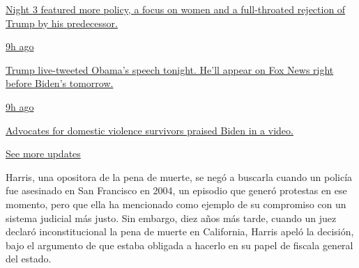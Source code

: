 \href{https://www.nytimes3xbfgragh.onion/live/2020/08/19/us/dnc-convention-election?action=click\&pgtype=Article\&state=default\&region=MAIN_CONTENT_1\&context=storylines_live_updates\#night-3-featured-more-policy-a-focus-on-women-and-a-full-throated-rejection-of-trump-by-his-predecessor}{Night
3 featured more policy, a focus on women and a full-throated rejection
of Trump by his predecessor.}

\href{https://www.nytimes3xbfgragh.onion/live/2020/08/19/us/dnc-convention-election?action=click\&pgtype=Article\&state=default\&region=MAIN_CONTENT_1\&context=storylines_live_updates\#trump-live-tweeted-obamas-speech-tonight-hell-appear-on-fox-news-right-before-bidens-tomorrow}{9h
ago}

\href{https://www.nytimes3xbfgragh.onion/live/2020/08/19/us/dnc-convention-election?action=click\&pgtype=Article\&state=default\&region=MAIN_CONTENT_1\&context=storylines_live_updates\#trump-live-tweeted-obamas-speech-tonight-hell-appear-on-fox-news-right-before-bidens-tomorrow}{Trump
live-tweeted Obama's speech tonight. He'll appear on Fox News right
before Biden's tomorrow.}

\href{https://www.nytimes3xbfgragh.onion/live/2020/08/19/us/dnc-convention-election?action=click\&pgtype=Article\&state=default\&region=MAIN_CONTENT_1\&context=storylines_live_updates\#advocates-for-domestic-violence-survivors-praised-biden-in-a-video}{9h
ago}

\href{https://www.nytimes3xbfgragh.onion/live/2020/08/19/us/dnc-convention-election?action=click\&pgtype=Article\&state=default\&region=MAIN_CONTENT_1\&context=storylines_live_updates\#advocates-for-domestic-violence-survivors-praised-biden-in-a-video}{Advocates
for domestic violence survivors praised Biden in a video.}

\href{https://www.nytimes3xbfgragh.onion/live/2020/08/19/us/dnc-convention-election?action=click\&pgtype=Article\&state=default\&region=MAIN_CONTENT_1\&context=storylines_live_updates}{See
more updates}

Harris, una opositora de la pena de muerte, se negó a buscarla cuando un
policía fue asesinado en San Francisco en 2004, un episodio que generó
protestas en ese momento, pero que ella ha mencionado como ejemplo de su
compromiso con un sistema judicial más justo. Sin embargo, diez años más
tarde, cuando un juez declaró inconstitucional la pena de muerte en
California, Harris apeló la decisión, bajo el argumento de que estaba
obligada a hacerlo en su papel de fiscala general del estado.

